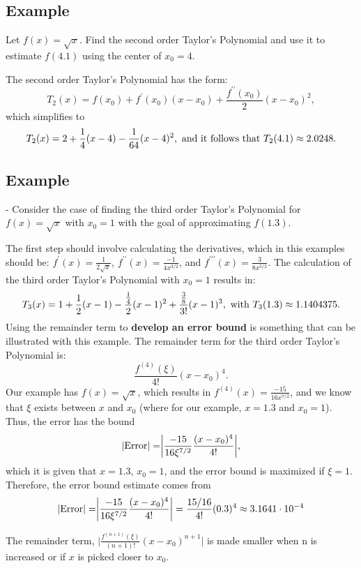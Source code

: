 \documentclass[twoside]{article}
\def\ds{\displaystyle}
\begin{document}
\subsection{Example} Let $\ds f(x) = \sqrt{x}$. Find the second order Taylor's Polynomial and use it to estimate $f(4.1)$ using the center of $\ds x_0=4$. 

The second order Taylor's Polynomial has the form:
$$T_2(x) = f(x_0) + f^{\prime}(x_0)(x-x_0) + \frac {f^{\prime  \prime}(x_0)}2(x-x_0)^2,$$
which simplifies to
$$T_2(x) = 2 + \frac 14(x-4) - \frac 1{64} (x-4)^2, \ {\rm and\ it \ follows \ that} \ T_2(4.1) \approx 2.0248 .$$

\subsection{Example} - Consider the case of finding the third order Taylor's Polynomial for $\ds f(x) = \sqrt{x}$ with $\ds x_0 = 1$ with the goal of approximating $\ds f(1.3)$.

The first step should involve calculating the derivatives, which in this examples should be: $\ds f^{\prime}(x) = \frac 1{2\sqrt{x}}$, $\ds f^{\prime \prime}(x) = \frac {-1}{4x^{3/2}}$, and $\ds f^{\prime \prime \prime}(x) = \frac {3}{8x^{5/2}}$. The calculation of the third order Taylor's Polynomial with $\ds x_0=1$ results in:
$$T_3(x) = 1 + \frac 12 (x-1) - \frac {\frac 14}2 (x-1)^2 + \frac{\frac 38}{3!}(x-1)^3, \  {\rm with} \ T_3(1.3) \approx 1.1404375.$$
Using the remainder term to {\bf develop an error bound} is something that can be illustrated with this example. The remainder term for the third order Taylor's Polynomial is:
$$\frac {f^{(4)}(\xi ) }{4!}(x-x_0)^4.$$
Our example has $\ds f(x) = \sqrt{x}$, which results in $\ds f^{(4)}(x)=\frac {-15}{16x^{7/2}}$, and we know that $\xi$ exists between $x$ and $\ds x_0$ (where for our example, $x=1.3$ and $\ds x_0=1$). Thus, the error has the bound
$$\vert {\rm Error} \vert =\biggr \vert \frac {-15}{16\xi^{7/2}}\frac {(x-x_0)^4}{4!} \biggr \vert, $$
which it is given that $x = 1.3$, $\ds x_0=1$, and the error bound is maximized if $\ds \xi = 1$. Therefore, the error bound estimate comes from
$$\vert {\rm Error} \vert =\biggr \vert \frac {-15}{16\xi^{7/2}}\frac {(x-x_0)^4}{4!} \biggr \vert = \frac {15/16}{4!}(0.3)^4 \approx 3.1641 \cdot 10^{-4} $$

The remainder term, $\ds \biggr \vert \frac {f^{(n+1)}(\xi)}{(n+1)!} (x - x_0)^{n+1} \biggr \vert$ is made smaller when n is increased or if $x$ is picked closer to $\ds x_0$.
\end{document}
